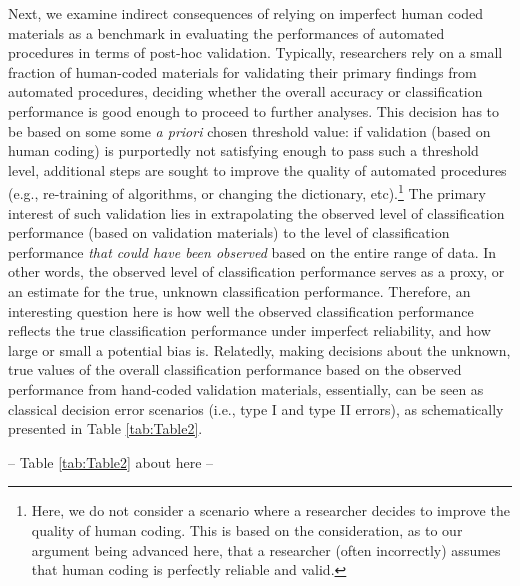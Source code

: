 \documentclass[man, 12pt, a4paper, nolmodern, noextraspace]{apa6}
\begin{document}
    Next, we examine indirect consequences of relying on imperfect human coded materials as a benchmark in evaluating the performances of automated procedures in terms of post-hoc validation. Typically, researchers rely on a small fraction of human-coded materials for validating their primary findings from automated procedures, deciding whether the overall accuracy or classification performance is good enough to proceed to further analyses. This decision has to be based on some some \textit{a priori} chosen threshold value: if validation (based on human coding) is purportedly not satisfying enough to pass such a threshold level, additional steps are sought to improve the quality of automated procedures (e.g., re-training of algorithms, or changing the dictionary, etc).\footnote{ Here, we do not consider a scenario where a researcher decides to improve the quality of human coding. This is based on the consideration, as to our argument being advanced here, that a researcher (often incorrectly) assumes that human coding is perfectly reliable and valid.} The primary interest of such validation lies in extrapolating the observed level of classification performance (based on validation materials) to the level of classification performance \textit{that could have been observed} based on the entire range of data. In other words, the observed level of classification performance serves as a proxy, or an estimate for the true, unknown classification performance. Therefore, an interesting question here is how well the observed classification performance reflects the true classification performance under imperfect reliability, and how large or small a potential bias is. Relatedly, making decisions about the unknown, true values of the overall classification performance based on the observed performance from hand-coded validation materials, essentially, can be seen as classical decision error scenarios (i.e., type I and type II errors), as schematically presented in Table \ref{tab:Table2}.
\centerline{ -- Table \ref{tab:Table2} about here -- }    
\end{document}
